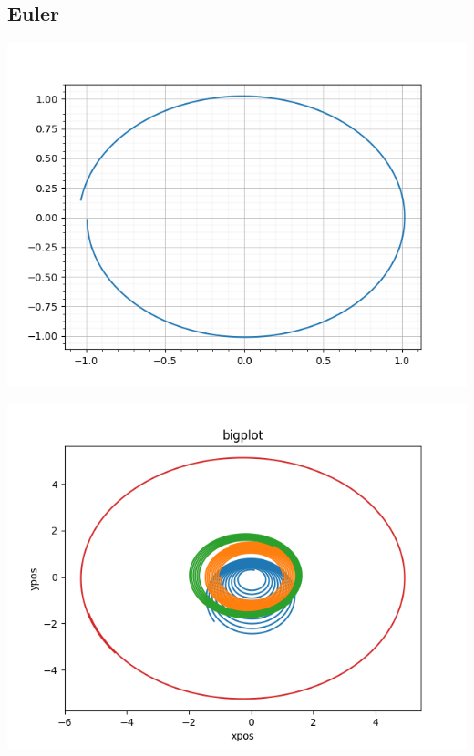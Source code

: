 \documentclass[12pt]{article}
\begin{document}
\subsection{Euler}
\includegraphics[scale=0.5]{binary_euler.png}

\includegraphics[scale=0.5]{euler_multiplanet.png}
\end{document}
